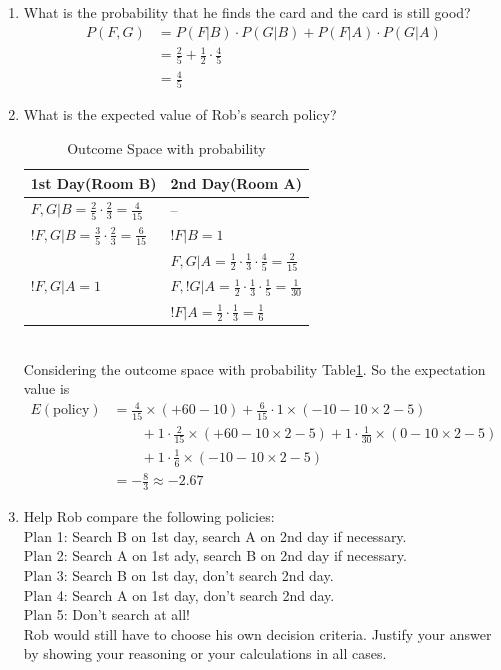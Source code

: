 \documentclass[preprint,12pt]{elsarticle}
\begin{document}
\begin{enumerate}[label=\alph*]
		\item What is the probability that he finds the card and the card
		is still good?
		\begin{align*}
			P(F,G) &= P(F|B) \cdot P(G|B) + P(F|A) \cdot P(G|A)\\
			&= \frac{2}{5} + \frac{1}{2}\cdot \frac{4}{5}\\
			&= \frac{4}{5}
		\end{align*}

		\item What is the expected value of Rob's search policy?
		\begin{table}[h!]
			\centering
			\begin{tabular}{|l|l|}
				\hline
				1st Day(Room B)                        & 2nd Day(Room A)       \\ \hline
				$F,G|B = \frac{2}{5}\cdot \frac{2}{3} = \frac{4}{15}$                          & --            \\ \hline
				$!F,G|B = \frac{3}{5}\cdot \frac{2}{3} = \frac{6}{15}$						& $!F|B=1$		\\ \hline
				\multirow{3}{*}{$!F,G|A = 1$} & $F,G|A = \frac{1}{2}\cdot \frac{1}{3}\cdot \frac{4}{5} = \frac{2}{15}$         \\ \cline{2-2} 
											   & $F,!G|A = \frac{1}{2}\cdot \frac{1}{3}\cdot \frac{1}{5} = \frac{1}{30}$ \\ \cline{2-2} 
											   & $!F|A = \frac{1}{2}\cdot \frac{1}{3} = \frac{1}{6}$   \\ \hline
			\end{tabular}
			\caption{Outcome Space with probability}
			\label{table2}
		\end{table}
		\\ Considering the outcome space with probability Table\ref{table2}. So the expectation value is
		\begin{align*}
			E(\text{policy}) &= \frac{4}{15}\times (+60-10) + \frac{6}{15}\cdot 1\times (-10-10\times 2 -5)\\
			&\qquad + 1\cdot \frac{2}{15}\times (+60-10\times 2 - 5) + 1\cdot \frac{1}{30}\times (0-10\times 2 - 5)\\
			&\qquad + 1\cdot \frac{1}{6}\times (-10-10\times 2 - 5)\\
			&=-\frac{8}{3}\approx -2.67
		\end{align*}

		\item Help Rob compare the following policies:
		\\ Plan 1: Search B on 1st day, search A on 2nd day if necessary.
		\\ Plan 2: Search A on 1st ady, search B on 2nd day if necessary.
		\\ Plan 3: Search B on 1st day, don't search 2nd day.
		\\ Plan 4: Search A on 1st day, don't search 2nd day.
		\\ Plan 5: Don't search at all!
		\\ Rob would still have to choose his own decision criteria. Justify your answer by showing your reasoning or your calculations in all cases.


\end{enumerate}
\end{document}
